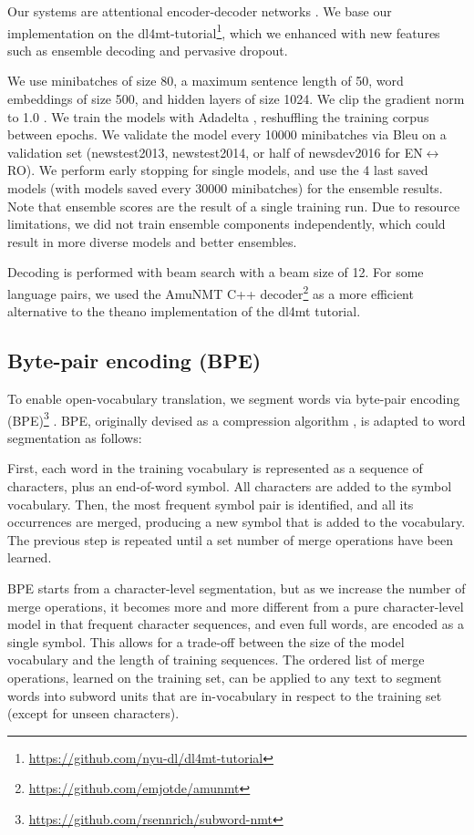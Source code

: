 \documentclass[11pt]{article}
\begin{document}
Our systems are attentional encoder-decoder networks \cite{DBLP:journals/corr/BahdanauCB14}.
We base our implementation on the dl4mt-tutorial\footnote{\url{https://github.com/nyu-dl/dl4mt-tutorial}}, which we enhanced with new features such as ensemble decoding and pervasive dropout.

We use minibatches of size 80, a maximum sentence length of 50, word embeddings of size 500, and hidden layers of size 1024.
We clip the gradient norm to 1.0 \cite{DBLP:conf/icml/PascanuMB13}.
We train the models with Adadelta \cite{DBLP:journals/corr/abs-1212-5701}, reshuffling the training corpus between epochs.
We validate the model every \num{10000} minibatches via {\sc Bleu} on a validation set (newstest2013, newstest2014, or half of newsdev2016 for EN$\leftrightarrow$RO).
We perform early stopping for single models, and use the 4 last saved models (with models saved every \num{30000} minibatches) for the ensemble results.
Note that ensemble scores are the result of a single training run.
Due to resource limitations, we did not train ensemble components independently, which could result in more diverse models and better ensembles.

Decoding is performed with beam search with a beam size of 12.
For some language pairs, we used the AmuNMT C++ decoder\footnote{\url{https://github.com/emjotde/amunmt}} as a more efficient alternative to the theano implementation of the dl4mt tutorial.

\subsection{Byte-pair encoding (BPE)}

To enable open-vocabulary translation, we segment words via byte-pair encoding (BPE)\footnote{\url{https://github.com/rsennrich/subword-nmt}} \cite{DBLP:journals/corr/SennrichHB15}.
BPE, originally devised as a compression algorithm \cite{Gage:1994:NAD:177910.177914}, is adapted to word segmentation as follows:

First, each word in the training vocabulary is represented as a sequence of characters, plus an end-of-word symbol.
All characters are added to the symbol vocabulary.
Then, the most frequent symbol pair is identified, and all its occurrences are merged, producing a new symbol that is added to the vocabulary.
The previous step is repeated until a set number of merge operations have been learned.

BPE starts from a character-level segmentation, but as we increase the number of merge operations, it becomes more and more different from a pure character-level model in that frequent character sequences, and even full words, are encoded as a single symbol.
This allows for a trade-off between the size of the model vocabulary and the length of training sequences.
The ordered list of merge operations, learned on the training set, can be applied to any text to segment words into subword units that are in-vocabulary in respect to the training set (except for unseen characters).
\end{document}
